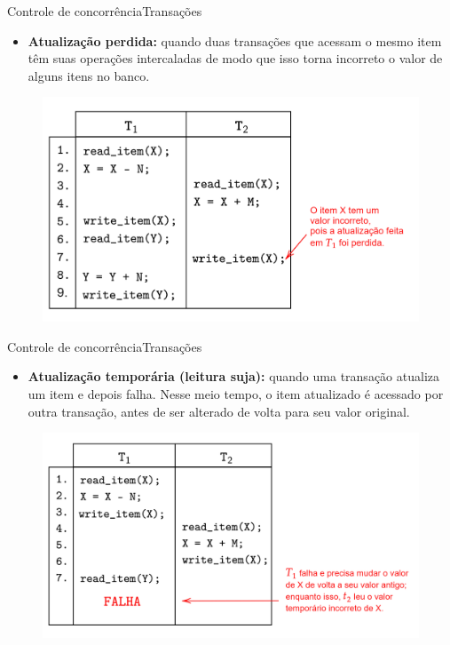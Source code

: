 \documentclass[t]{beamer}
\begin{document}
\begin{ftst}{Controle de concorrência}{Transações}
\begin{itemize}
    \item \textbf{Atualização perdida:} quando duas transações que acessam o mesmo item têm suas operações intercaladas de modo que isso torna incorreto o valor de alguns itens no banco.
\end{itemize}
\begin{figure}
    \centering
    \includegraphics[scale=0.15]{Figuras_transacoes/7.png}
\end{figure}
\end{ftst}


\begin{ftst}{Controle de concorrência}{Transações}
\begin{itemize}
    \item \textbf{Atualização temporária (leitura suja):} quando uma transação atualiza um item e depois falha. Nesse meio tempo, o item atualizado é acessado por outra transação, antes de ser alterado de volta para seu valor original.
\end{itemize}
\begin{figure}
    \centering
    \includegraphics[scale=0.15]{Figuras_transacoes/8.png}
\end{figure}
\end{ftst}
\end{document}
